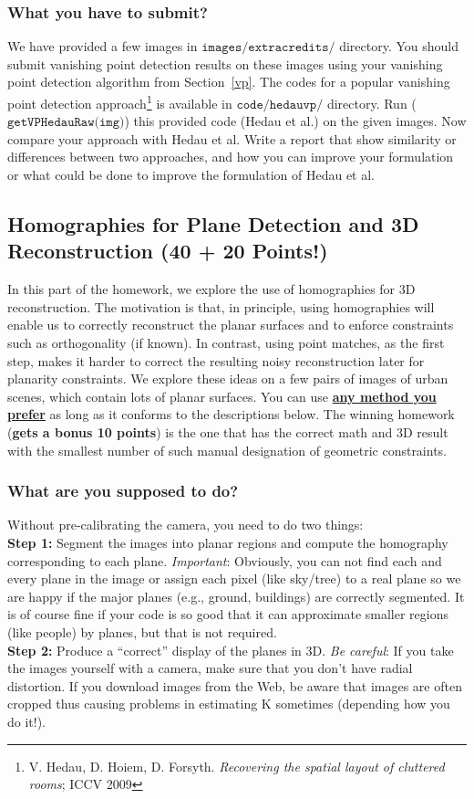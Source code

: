 \documentclass[11pt]{article}
\begin{document}
\subsubsection{What you have to submit?}
\label{sec:tosubmitec}
We have provided a few images in  $\texttt{images/extracredits/}$ directory. You should submit vanishing point detection results on these images using your vanishing point detection algorithm from Section~\ref{vp}. The codes for a popular vanishing point detection approach\footnote{V. Hedau, D. Hoiem, D. Forsyth. \textit{Recovering the spatial layout of cluttered rooms}; ICCV 2009} is available in $\texttt{code/hedauvp/}$ directory. Run ($\texttt{getVPHedauRaw(img)}$) this provided code (Hedau et al.) on the given images. Now compare your approach with Hedau et al. Write a report that show similarity or differences between two approaches, and how you can improve your formulation or what could be done to improve the formulation of Hedau et al.

\subsection{Homographies for Plane Detection and 3D Reconstruction (40  + 20 Points!)}
In this part of the homework, we explore the use of homographies for 3D reconstruction. The motivation is that, in principle, using homographies will enable us to correctly reconstruct the planar surfaces and to enforce constraints such as orthogonality (if known). In contrast, using point matches, as the first step, makes it harder to correct the resulting noisy reconstruction later for planarity constraints. We explore these ideas on a few pairs of images of urban scenes, which
contain lots of planar surfaces. You can use \underline{{\bf any method you prefer}} as long as it conforms to the descriptions below. The winning homework (\textbf{gets a bonus 10 points}) is the one that has the
correct math and 3D result with the smallest number of such manual designation of geometric constraints.


\subsubsection{What are you supposed to do?}
Without pre-calibrating the camera, you need to do two things:\\
{\bf Step 1:} Segment the images into planar regions and compute the homography
corresponding to each plane. {\it Important}: Obviously, you can not find each and every plane in the image or assign each pixel (like sky/tree) to a real plane so we are happy if the major planes (e.g., ground, buildings) are correctly segmented. It is of course fine if your code is so good that it can approximate smaller regions (like people) by planes, but that is not required.\\
{\bf Step 2:} Produce a ``correct'' display of the planes in 3D. {\it Be careful}: If you take the images yourself with a camera, make sure that you don’t have radial distortion. If you download images from the Web, be aware that images are often cropped thus causing problems in estimating K sometimes (depending how you do it!).
\end{document}
